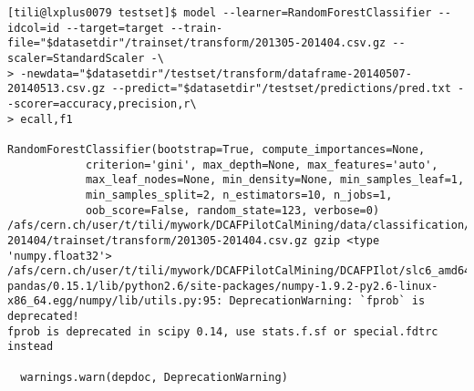 \begin{verbatim}
[tili@lxplus0079 testset]$ model --learner=RandomForestClassifier --idcol=id --target=target --train-file="$datasetdir"/trainset/transform/201305-201404.csv.gz --scaler=StandardScaler -\
> -newdata="$datasetdir"/testset/transform/dataframe-20140507-20140513.csv.gz --predict="$datasetdir"/testset/predictions/pred.txt --scorer=accuracy,precision,r\
> ecall,f1

RandomForestClassifier(bootstrap=True, compute_importances=None,
            criterion='gini', max_depth=None, max_features='auto',
            max_leaf_nodes=None, min_density=None, min_samples_leaf=1,
            min_samples_split=2, n_estimators=10, n_jobs=1,
            oob_score=False, random_state=123, verbose=0)
/afs/cern.ch/user/t/tili/mywork/DCAFPilotCalMining/data/classification/tier2/tier2_201305-201404/trainset/transform/201305-201404.csv.gz gzip <type 'numpy.float32'>
/afs/cern.ch/user/t/tili/mywork/DCAFPilotCalMining/DCAFPIlot/slc6_amd64_gcc481/external/py2-pandas/0.15.1/lib/python2.6/site-packages/numpy-1.9.2-py2.6-linux-x86_64.egg/numpy/lib/utils.py:95: DeprecationWarning: `fprob` is deprecated!
fprob is deprecated in scipy 0.14, use stats.f.sf or special.fdtrc instead

  warnings.warn(depdoc, DeprecationWarning)


\end{verbatim}

